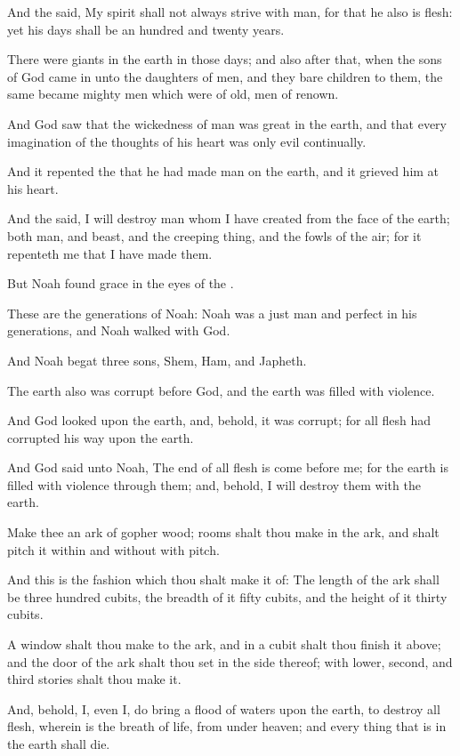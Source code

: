 \verse And the \LORD said, My spirit shall not always strive with man, for that he also is flesh: yet his days shall be an hundred and twenty years.

\verse There were giants in the earth in those days; and also after that, when the sons of God came in unto the daughters of men, and they bare children to them, the same became mighty men which were of old, men of renown.

\verse And God saw that the wickedness of man was great in the earth, and that every imagination of the thoughts of his heart was only evil continually.

\verse And it repented the \LORD that he had made man on the earth, and it grieved him at his heart.

\verse And the \LORD said, I will destroy man whom I have created from the face of the earth; both man, and beast, and the creeping thing, and the fowls of the air; for it repenteth me that I have made them.

\verse But Noah found grace in the eyes of the \LORD.

\verse These are the generations of Noah: Noah was a just man and perfect in his generations, and Noah walked with God.

\verse And Noah begat three sons, Shem, Ham, and Japheth.

\verse The earth also was corrupt before God, and the earth was filled with violence.

\verse And God looked upon the earth, and, behold, it was corrupt; for all flesh had corrupted his way upon the earth.

\verse And God said unto Noah, The end of all flesh is come before me; for the earth is filled with violence through them; and, behold, I will destroy them with the earth.

\verse Make thee an ark of gopher wood; rooms shalt thou make in the ark, and shalt pitch it within and without with pitch.

\verse And this is the fashion which thou shalt make it of: The length of the ark shall be three hundred cubits, the breadth of it fifty cubits, and the height of it thirty cubits.

\verse A window shalt thou make to the ark, and in a cubit shalt thou finish it above; and the door of the ark shalt thou set in the side thereof; with lower, second, and third stories shalt thou make it.

\verse And, behold, I, even I, do bring a flood of waters upon the earth, to destroy all flesh, wherein is the breath of life, from under heaven; and every thing that is in the earth shall die.

